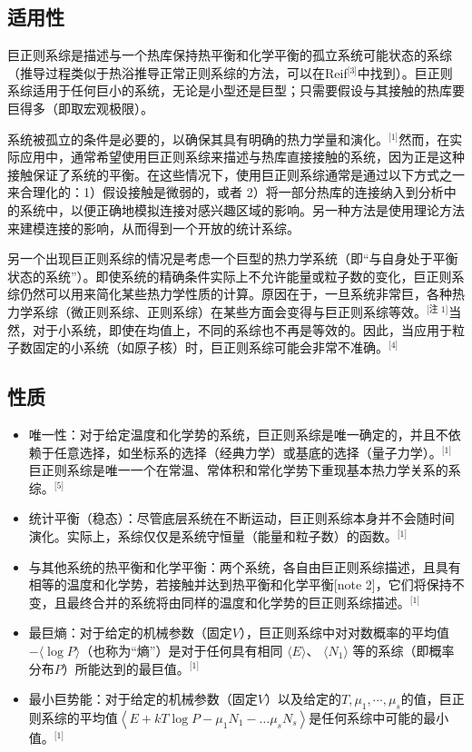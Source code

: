 \subsection{适用性}  
巨正则系综是描述与一个热库保持热平衡和化学平衡的孤立系统可能状态的系综（推导过程类似于热浴推导正常正则系综的方法，可以在Reif\(^\text{[3]}\)中找到）。巨正则系综适用于任何巨小的系统，无论是小型还是巨型；只需要假设与其接触的热库要巨得多（即取宏观极限）。

系统被孤立的条件是必要的，以确保其具有明确的热力学量和演化。\(^\text{[1]}\)然而，在实际应用中，通常希望使用巨正则系综来描述与热库直接接触的系统，因为正是这种接触保证了系统的平衡。在这些情况下，使用巨正则系综通常是通过以下方式之一来合理化的：1）假设接触是微弱的，或者 2）将一部分热库的连接纳入到分析中的系统中，以便正确地模拟连接对感兴趣区域的影响。另一种方法是使用理论方法来建模连接的影响，从而得到一个开放的统计系综。

另一个出现巨正则系综的情况是考虑一个巨型的热力学系统（即“与自身处于平衡状态的系统”）。即使系统的精确条件实际上不允许能量或粒子数的变化，巨正则系综仍然可以用来简化某些热力学性质的计算。原因在于，一旦系统非常巨，各种热力学系综（微正则系综、正则系综）在某些方面会变得与巨正则系综等效。\(^\text{[注 1]}\)当然，对于小系统，即使在均值上，不同的系综也不再是等效的。因此，当应用于粒子数固定的小系统（如原子核）时，巨正则系综可能会非常不准确。\(^\text{[4]}\)
\subsection{性质}  
\begin{itemize}
\item 唯一性：对于给定温度和化学势的系统，巨正则系综是唯一确定的，并且不依赖于任意选择，如坐标系的选择（经典力学）或基底的选择（量子力学）。\(^\text{[1]}\) 巨正则系综是唯一一个在常温、常体积和常化学势下重现基本热力学关系的系综。\(^\text{[5]}\)  
\item 统计平衡（稳态）：尽管底层系统在不断运动，巨正则系综本身并不会随时间演化。实际上，系综仅仅是系统守恒量（能量和粒子数）的函数。\(^\text{[1]}\)  
\item 与其他系统的热平衡和化学平衡：两个系统，各自由巨正则系综描述，且具有相等的温度和化学势，若接触并达到热平衡和化学平衡[note 2]，它们将保持不变，且最终合并的系统将由同样的温度和化学势的巨正则系综描述。\(^\text{[1]}\) 
\item 最巨熵：对于给定的机械参数（固定\(V\)），巨正则系综中对对数概率的平均值 \( -\langle \log P \rangle \)（也称为“熵”）是对于任何具有相同 \( \langle E \rangle \)、 \( \langle N_1 \rangle \) 等的系综（即概率分布\(P\)）所能达到的最巨值。\(^\text{[1]}\) 
\item 最小巨势能：对于给定的机械参数（固定\(V\)）以及给定的\(T,\mu_1,\cdots,\mu_s\)的值，巨正则系综的平均值\({\displaystyle \left\langle E + kT\log P - \mu_{1}N_{1} - \ldots \mu_{s}N_{s} \right\rangle}\)是任何系综中可能的最小值。\(^\text{[1]}\)
\end{itemize}
